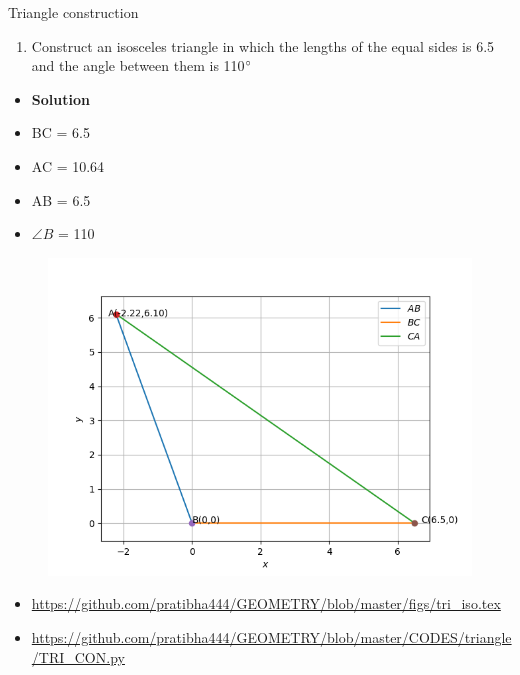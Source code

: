 \begin{frame}{Triangle construction}
\begin{enumerate}
\conti
\item Construct an isosceles triangle in which the lengths of the equal sides is 6.5 and the angle between them is 110$\degree$
\seti
\end{enumerate}
\begin{itemize}
\item\textbf{Solution}\\

\item BC = 6.5 \item AC = 10.64
\item AB = 6.5\\
\item $\angle B$ = 110\\ 
\end{itemize}
\end{frame}

\begin{frame}
\begin{figure}
\includegraphics[scale=.4]{./CODES/triangle/TRI_CON.png}
\end{figure}
\begin{itemize}
\item \url{https://github.com/pratibha444/GEOMETRY/blob/master/figs/tri_iso.tex}
\item \url{https://github.com/pratibha444/GEOMETRY/blob/master/CODES/triangle/TRI_CON.py}
\end{itemize}
\end{frame}